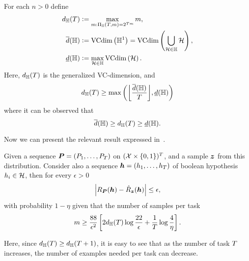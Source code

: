 \begin{definition}
For each $n > 0$ define
\begin{align}
    d_{\mathbb{H}}(T) &\vcentcolon= \max_{m: \Pi_{\mathbb{H}}(T, m) = 2^{T m}} m , \nonumber \\
    \overline{d}(\mathbb{H}) &\vcentcolon= \text{VCdim}\left(\mathbb{H}^1\right) = \text{VCdim}\left(\bigcup_{\mathcal{H} \in \mathbb{H}} \mathcal{H}\right)  ,  \nonumber \\
    \underline{d}(\mathbb{H}) &\vcentcolon= \max_{\mathcal{H} \in \mathbb{H}} \text{VCdim}\left(\mathcal{H}\right)  . \nonumber
\end{align}
Here, $d_{\mathbb{H}}(T)$ is the generalized VC-dimension, and
\begin{equation}
    \nonumber
    d_\hypspacef(\ntasks) \geq \max\left(\floor*{\frac{\overline{d}(\hypspacef)}{\ntasks}}, \underline{d}(\hypspacef) \right)
\end{equation}
where it can be observed that 
\begin{equation}
    \label{eq:genvc_inequalities}
    \overline{d}(\hypspacef) \geq  d_\hypspacef(\ntasks)\geq \underline{d}(\hypspacef).
\end{equation}
\end{definition}
Now we can present the relevant result expressed in~\cite[Corollary~13]{baxter2000model}.
\begin{theorem}\label{th:baxter_vcdim}
    Given a sequence $\bm{P} = (P_1, \ldots, P_T)$ on $(\mathcal{X} \times \left\{0, 1\right\})^T$, and a sample $\bm{z}$ from this distribution. Consider also a sequence $\bm{h} = (h_1, \ldots, h_T)$ of boolean hypothesis $h_i \in \mathcal{H}$, then for every $\epsilon > 0$
\begin{equation}
    \nonumber
    \left|R_{\bm{P}}(\bm{h}) - \hat{R}_{\bm{z}}(\bm{h})\right| \leq \epsilon,
\end{equation}
with probability $1 - \eta$ given that the number of samples per task
\begin{equation}
    \label{eq:bound_npertask_genvcdim}
    \npertask \geq \frac{88}{\epsilon^2} \left[2 d_\hypspacef(\ntasks) \log \frac{22}{\epsilon} + \frac{1}{\ntasks}\log\frac{4}{\eta} \right] .
\end{equation}
\end{theorem}
Here, since $d_{\mathbb{H}}(T) \geq d_{\mathbb{H}}(T+1)$, it is easy to see that as the number of task $T$ increases, the number of examples needed per task can decrease. 
